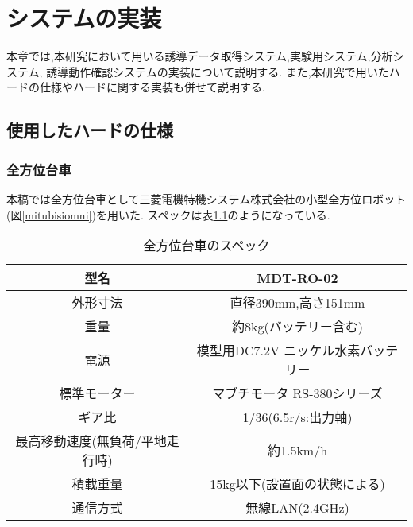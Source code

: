 

\chapter{システムの実装}
本章では,本研究において用いる誘導データ取得システム,実験用システム,分析システム,
誘導動作確認システムの実装について説明する.
また,本研究で用いたハードの仕様やハードに関する実装も併せて説明する.

\section{使用したハードの仕様}
\subsection{全方位台車}
\par
本稿では全方位台車として三菱電機特機システム株式会社の小型全方位ロボット(図\ref{mitubisiomni})を用いた.
スペックは表\ref{mitubisispec}のようになっている.

\begin{comment}
\begin{figure}[!h]
\begin{center}

\texttt{[image: mitubisiomni.eps]}
\caption{小型全方位ロボット}
\label{mitubisiomni}
\end{center}
\end{figure}
\end{comment}

\begin{table}[!h]



\begin{center}
\begin{tabular}{|c|c|}


\hline
型名 & MDT-RO-02\\
\hline
外形寸法 & 直径390mm,高さ151mm \\
\hline
重量 & 約8kg(バッテリー含む) \\
\hline
電源 & 模型用DC7.2V ニッケル水素バッテリー\\
\hline
標準モーター & マブチモータ RS-380シリーズ \\
\hline
ギア比 & 1/36(6.5r/s:出力軸)\\
\hline
最高移動速度(無負荷/平地走行時)  & 約1.5km/h\\
\hline
積載重量 & 15kg以下(設置面の状態による)\\
\hline
通信方式 & 無線LAN(2.4GHz)\\
\hline
\end{tabular}
\end{center}

\caption{全方位台車のスペック}
\label{mitubisispec}
\end{table}



